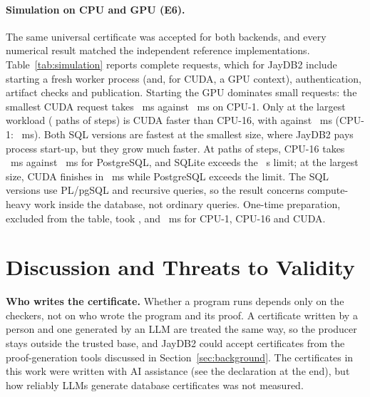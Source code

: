 \documentclass[12pt]{article}
\newcommand{\num}[1]{\pgfmathprintnumber[fixed,precision=2,1000 sep={\mathord{,}}]{#1}}
\begin{document}
\paragraph{Simulation on CPU and GPU (E6).}
The same universal certificate was accepted for both backends, and every
numerical result matched the independent reference implementations. Table~\ref{tab:simulation}
reports complete requests, which for JayDB2 include starting a fresh worker
process (and, for CUDA, a GPU context), authentication, artifact checks and
publication. Starting the GPU dominates small requests: the smallest CUDA
request takes \num{\SimulationSmallCudaMs}~ms against
\num{\SimulationSmallCpuOneMs}~ms on CPU-1. Only at the largest workload
(\SimulationLargestPaths{} paths of \SimulationLargestSteps{} steps) is CUDA
faster than CPU-16, with \num{\SimulationLargeCudaMs} against
\num{\SimulationLargeCpuSixteenMs}~ms (CPU-1: \num{\SimulationLargeCpuOneMs}~ms).
Both SQL versions are fastest at the smallest size, where JayDB2 pays process
start-up, but they grow much faster. At \SimulationMidPaths{} paths of
\SimulationMidSteps{} steps, CPU-16 takes \num{\SimulationMidCpuSixteenMs}~ms
against \num{\SimulationMidPostgresMs}~ms for PostgreSQL, and SQLite exceeds the
\SimulationTimeoutSeconds{}~s limit; at the largest size, CUDA finishes in
\num{\SimulationLargeCudaMs}~ms while PostgreSQL exceeds the limit. The SQL
versions use PL/pgSQL and recursive queries, so the result concerns
compute-heavy work inside the database, not ordinary queries. One-time preparation, excluded from the table, took
\num{\SimulationCpuOnePreparationMs}, \num{\SimulationCpuSixteenPreparationMs}
and \num{\SimulationCudaPreparationMs}~ms for CPU-1, CPU-16 and CUDA.

\begin{table}[tb]\centering\footnotesize
\setlength{\tabcolsep}{3pt}
\caption{E6: median complete-request latency (ms), $n=\SimulationRepeats$ per
cell after \SimulationWarmups{} warm-up. CPU-1, CPU-16 and CUDA are JayDB2
backends. ``Timeout'' is an observed cancellation; ``not run'' follows an
earlier timeout.}
\label{tab:simulation}

\end{table}

\section{Discussion and Threats to Validity}
\label{sec:discussion}
\textbf{Who writes the certificate.} Whether a program runs depends only on the
checkers, not on who wrote the program and its proof. A certificate written by a
person and one generated by an LLM are treated the same way, so the producer
stays outside the trusted base, and JayDB2 could accept certificates from the
proof-generation tools discussed in Section~\ref{sec:background}. The certificates in this
work were written with AI assistance (see the declaration at the end), but how
reliably LLMs generate database certificates was not measured.
\end{document}

